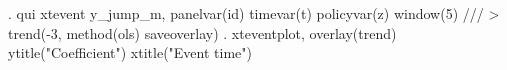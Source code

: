 . qui xtevent y_jump_m, panelvar(id) timevar(t) policyvar(z) window(5) ///
>         trend(-3, method(ols) saveoverlay) 
{\smallskip}
. xteventplot, overlay(trend) ytitle("Coefficient") xtitle("Event time")
